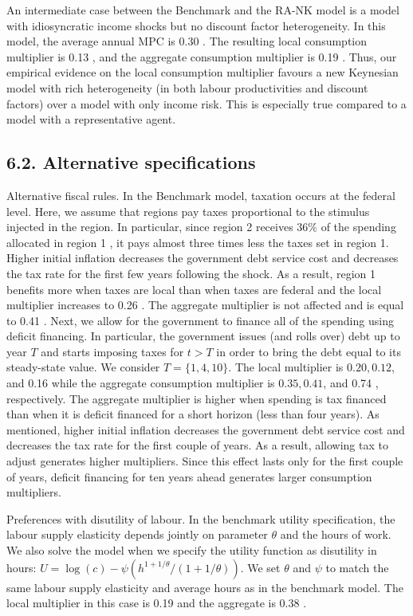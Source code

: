\documentclass[10pt]{article}
\begin{document}
An intermediate case between the Benchmark and the RA-NK model is a model with idiosyncratic income shocks but no discount factor heterogeneity. In this model, the average annual MPC is 0.30 . The resulting local consumption multiplier is 0.13 , and the aggregate consumption multiplier is 0.19 . Thus, our empirical evidence on the local consumption multiplier favours a new Keynesian model with rich heterogeneity (in both labour productivities and discount factors) over a model with only income risk. This is especially true compared to a model with a representative agent.

\subsection*{6.2. Alternative specifications}
Alternative fiscal rules. In the Benchmark model, taxation occurs at the federal level. Here, we assume that regions pay taxes proportional to the stimulus injected in the region. In particular, since region 2 receives $36 \%$ of the spending allocated in region 1 , it pays almost three times less the taxes set in region 1. Higher initial inflation decreases the government debt service cost and decreases the tax rate for the first few years following the shock. As a result, region 1 benefits more when taxes are local than when taxes are federal and the local multiplier increases to 0.26 . The aggregate multiplier is not affected and is equal to 0.41 . Next, we allow for the government to finance all of the spending using deficit financing. In particular, the government issues (and rolls over) debt up to year $T$ and starts imposing taxes for $t>T$ in order to bring the debt equal to its steady-state value. We consider $T=\{1,4,10\}$. The local multiplier is $0.20,0.12$, and 0.16 while the aggregate consumption multiplier is $0.35,0.41$, and 0.74 , respectively. The aggregate multiplier is higher when spending is tax financed than when it is deficit financed for a short horizon (less than four years). As mentioned, higher initial inflation decreases the government debt service cost and decreases the tax rate for the first couple of years. As a result, allowing tax to adjust generates higher multipliers. Since this effect lasts only for the first couple of years, deficit financing for ten years ahead generates larger consumption multipliers.

Preferences with disutility of labour. In the benchmark utility specification, the labour supply elasticity depends jointly on parameter $\theta$ and the hours of work. We also solve the model when we specify the utility function as disutility in hours: $U=\log (c)-\psi\left(h^{1+1 / \theta} /(1+1 / \theta)\right)$. We set $\theta$ and $\psi$ to match the same labour supply elasticity and average hours as in the benchmark model. The local multiplier in this case is 0.19 and the aggregate is 0.38 .
\end{document}
